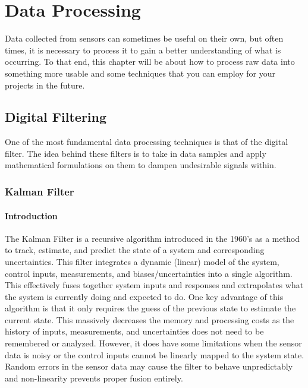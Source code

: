 %

\chapter{Data Processing}
\setchapterpreamble[u]{\margintoc}

Data collected from sensors can sometimes be useful on their own, but often times, it is necessary to process it to gain a better understanding of what is occurring.
To that end, this chapter will be about how to process raw data into something more usable and some techniques that you can employ for your projects in the future.

    \section{Digital Filtering} 
    One of the most fundamental data processing techniques is that of the digital filter.
    The idea behind these filters is to take in data samples and apply mathematical formulations on them to dampen undesirable signals within.

        \subsection{Kalman Filter} 
        \subsubsection*{Introduction} The Kalman Filter is a recursive algorithm introduced in the 1960's as a method to track, estimate, and predict the state of a system and corresponding uncertainties.
        This filter integrates a dynamic (linear) model of the system, control inputs, measurements, and biases/uncertainties into a single algorithm.
        This effectively fuses together system inputs and responses and extrapolates what the system is currently doing and expected to do.
        One key advantage of this algorithm is that it only requires the guess of the previous state to estimate the current state. 
        This massively decreases the memory and processing costs as the history of inputs, measurements, and uncertainties does not need to be remembered or analyzed.
        However, it does have some limitations when the sensor data is noisy or the control inputs cannot be linearly mapped to the system state.
        Random errors in the sensor data may cause the filter to behave unpredictably and non-linearity prevents proper fusion entirely.


